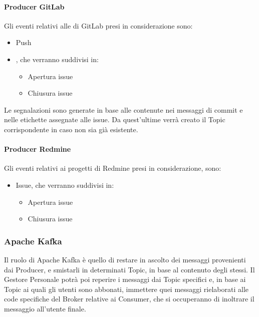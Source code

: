 		\paragraph{Producer GitLab}
		Gli eventi relativi alle  di GitLab presi in considerazione sono:
		\begin{itemize}
			\item Push
			\item {}, che verranno suddivisi in:
			\begin{itemize}
				\item Apertura issue
				\item Chiusura issue
			\end{itemize}
		\end{itemize}
		Le segnalazioni sono generate in base alle  contenute nei messaggi di commit e nelle etichette assegnate alle issue.
		Da quest'ultime verrà creato il Topic corrispondente in caso non sia già esistente.

		\paragraph{Producer Redmine}
		Gli eventi relativi ai progetti di Redmine presi in considerazione, sono:
		\begin{itemize}
			\item Issue, che verranno suddivisi in:
			\begin{itemize}
				\item Apertura issue
				\item Chiusura issue
			\end{itemize}
		\end{itemize}



	\subsubsection{Apache Kafka}\label{TecnologieBroker}
	Il ruolo di Apache Kafka è quello di restare in ascolto dei messaggi provenienti dai
	Producer, e smistarli in determinati Topic, in base al contenuto degli stessi.
	Il Gestore Personale potrà poi reperire i messaggi dai Topic specifici e,
	in base ai Topic ai quali gli utenti sono abbonati, immettere quei messaggi rielaborati alle code specifiche del Broker relative ai Consumer, che si occuperanno di
	inoltrare il messaggio all'utente finale.

